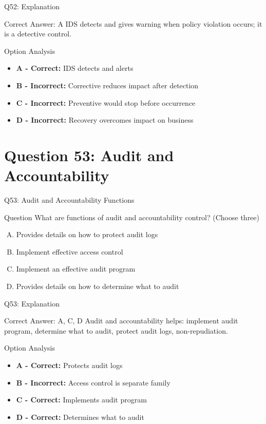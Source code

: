 \documentclass{beamer}
\begin{document}
	\begin{frame}{Q52: Explanation}
		\begin{block}{Correct Answer: A}
			IDS detects and gives warning when policy violation occurs; it is a detective control.
		\end{block}
		\begin{block}{Option Analysis}
			\begin{itemize}
				\item \textbf{A - Correct:} IDS detects and alerts
				\item \textbf{B - Incorrect:} Corrective reduces impact after detection
				\item \textbf{C - Incorrect:} Preventive would stop before occurrence
				\item \textbf{D - Incorrect:} Recovery overcomes impact on business
			\end{itemize}
		\end{block}
	\end{frame}
	
	\section{Question 53: Audit and Accountability}
	
	\begin{frame}{Q53: Audit and Accountability Functions}
		\begin{block}{Question}
			What are functions of audit and accountability control? (Choose three)
		\end{block}
		\begin{enumerate}[(A)]
			\item Provides details on how to protect audit logs
			\item Implement effective access control
			\item Implement an effective audit program
			\item Provides details on how to determine what to audit
		\end{enumerate}
	\end{frame}
	
	\begin{frame}{Q53: Explanation}
		\begin{block}{Correct Answer: A, C, D}
			Audit and accountability helps: implement audit program, determine what to audit, protect audit logs, non-repudiation.
		\end{block}
		\begin{block}{Option Analysis}
			\begin{itemize}
				\item \textbf{A - Correct:} Protects audit logs
				\item \textbf{B - Incorrect:} Access control is separate family
				\item \textbf{C - Correct:} Implements audit program
				\item \textbf{D - Correct:} Determines what to audit
			\end{itemize}
		\end{block}
	\end{frame}
	
\end{document}
